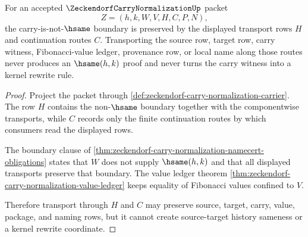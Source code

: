 \begin{theorem}
\label{thm:zeckendorf-carry-normalization-boundary-transport}
For an accepted $\ZeckendorfCarryNormalizationUp$ packet
$$
Z=(h,k,W,V,H,C,P,N),
$$
the carry-is-not-$\hsame$ boundary is preserved by the displayed transport rows
$H$ and continuation routes $C$. Transporting the source row, target row, carry
witness, Fibonacci-value ledger, provenance row, or local name along those
routes never produces an $\hsame(h,k)$ proof and never turns the carry witness
into a kernel rewrite rule.
\end{theorem}
\begin{proof}
Project the packet through
\autoref{def:zeckendorf-carry-normalization-carrier}. The row $H$ contains the
non-$\hsame$ boundary together with the componentwise transports, while $C$
records only the finite continuation routes by which consumers read the
displayed rows.

The boundary clause of
\autoref{thm:zeckendorf-carry-normalization-namecert-obligations} states that
$W$ does not supply $\hsame(h,k)$ and that all displayed transports preserve
that boundary. The value ledger theorem
\autoref{thm:zeckendorf-carry-normalization-value-ledger} keeps equality of
Fibonacci values confined to $V$.

Therefore transport through $H$ and $C$ may preserve source, target, carry,
value, package, and naming rows, but it cannot create source-target history
sameness or a kernel rewrite coordinate.
\end{proof}

